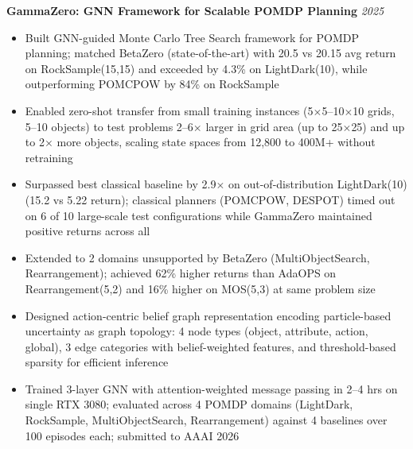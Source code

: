 \textbf{GammaZero: GNN Framework for Scalable POMDP Planning} \hfill \textit{2025}
\vspace{0.1cm}
\begin{itemize}
\item Built GNN-guided Monte Carlo Tree Search framework for POMDP planning; matched BetaZero (state-of-the-art) with 20.5 vs 20.15 avg return on RockSample(15,15) and exceeded by 4.3\% on LightDark(10), while outperforming POMCPOW by 84\% on RockSample
\item Enabled zero-shot transfer from small training instances (5$\times$5--10$\times$10 grids, 5--10 objects) to test problems 2--6$\times$ larger in grid area (up to 25$\times$25) and up to 2$\times$ more objects, scaling state spaces from 12,800 to 400M+ without retraining
\item Surpassed best classical baseline by 2.9$\times$ on out-of-distribution LightDark(10) (15.2 vs 5.22 return); classical planners (POMCPOW, DESPOT) timed out on 6 of 10 large-scale test configurations while GammaZero maintained positive returns across all
\item Extended to 2 domains unsupported by BetaZero (MultiObjectSearch, Rearrangement); achieved 62\% higher returns than AdaOPS on Rearrangement(5,2) and 16\% higher on MOS(5,3) at same problem size
\item Designed action-centric belief graph representation encoding particle-based uncertainty as graph topology: 4 node types (object, attribute, action, global), 3 edge categories with belief-weighted features, and threshold-based sparsity for efficient inference
\item Trained 3-layer GNN with attention-weighted message passing in 2--4 hrs on single RTX 3080; evaluated across 4 POMDP domains (LightDark, RockSample, MultiObjectSearch, Rearrangement) against 4 baselines over 100 episodes each; submitted to AAAI 2026
\end{itemize}
